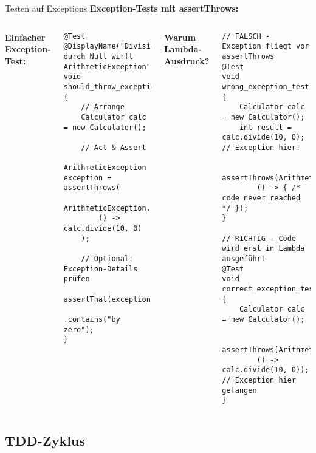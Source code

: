\begin{frame}[fragile]{Testen auf Exceptions}
  \textbf{Exception-Tests mit assertThrows:}

  \begin{columns}[T]
    \textbf{Einfacher Exception-Test:}
    \begin{lstlisting}[style=java, basicstyle=\tiny\ttfamily]
@Test
@DisplayName("Division durch Null wirft ArithmeticException")
void should_throw_exception_for_division_by_zero() {
    // Arrange
    Calculator calc = new Calculator();

    // Act & Assert
    ArithmeticException exception = assertThrows(
        ArithmeticException.class,
        () -> calc.divide(10, 0)
    );

    // Optional: Exception-Details prüfen
    assertThat(exception.getMessage())
        .contains("by zero");
}
    \end{lstlisting}

    \textbf{Warum Lambda-Ausdruck?}
    \begin{lstlisting}[style=java, basicstyle=\tiny\ttfamily]
// FALSCH - Exception fliegt vor assertThrows
@Test
void wrong_exception_test() {
    Calculator calc = new Calculator();
    int result = calc.divide(10, 0);  // Exception hier!

    assertThrows(ArithmeticException.class,
        () -> { /* code never reached */ });
}

// RICHTIG - Code wird erst in Lambda ausgeführt
@Test
void correct_exception_test() {
    Calculator calc = new Calculator();

    assertThrows(ArithmeticException.class,
        () -> calc.divide(10, 0));  // Exception hier gefangen
}
    \end{lstlisting}
  \end{columns}
\end{frame}


\subsection{TDD-Zyklus}

